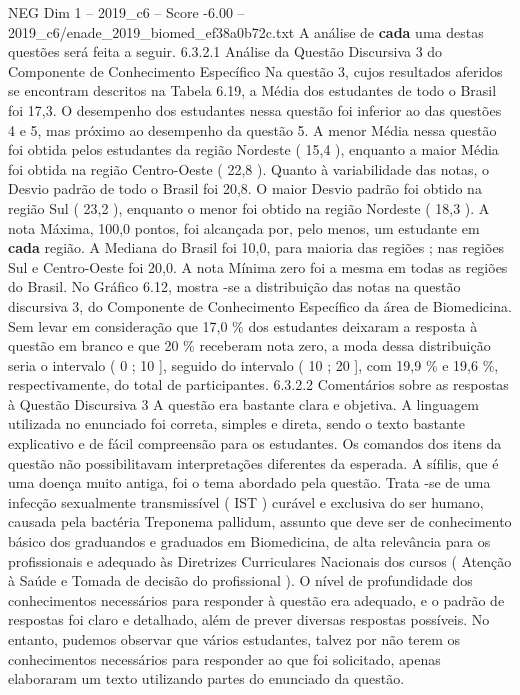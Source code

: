 \begin{textsample}{NEG Dim 1 – 2019\_c6 – Score -6.00 – 2019\_c6/enade\_2019\_biomed\_ef38a0b72c.txt}
A análise de \textbf{cada} uma destas questões será feita a seguir. 6.3.2.1 Análise da Questão Discursiva 3 do Componente de Conhecimento Específico Na questão 3, cujos resultados aferidos se encontram descritos na Tabela 6.19, a Média dos estudantes de todo o Brasil foi 17,3.
O desempenho dos estudantes nessa questão foi inferior ao das questões 4 e 5, mas próximo ao desempenho da questão 5.
A menor Média nessa questão foi obtida pelos estudantes da região Nordeste ( 15,4 ), enquanto a maior Média foi obtida na região Centro-Oeste ( 22,8 ).
Quanto à variabilidade das notas, o Desvio padrão de todo o Brasil foi 20,8.
O maior Desvio padrão foi obtido na região Sul ( 23,2 ), enquanto o menor foi obtido na região Nordeste ( 18,3 ).
A nota Máxima, 100,0 pontos, foi alcançada por, pelo menos, um estudante em \textbf{cada} região.
A Mediana do Brasil foi 10,0, para maioria das regiões ; nas regiões Sul e Centro-Oeste foi 20,0.
A nota Mínima zero foi a mesma em todas as regiões do Brasil.
No Gráfico 6.12, mostra -se a distribuição das notas na questão discursiva 3, do Componente de Conhecimento Específico da área de Biomedicina.
Sem levar em consideração que 17,0 \% dos estudantes deixaram a resposta à questão em branco e que 20 \% receberam nota zero, a moda dessa distribuição seria o intervalo ( 0 ; 10 ], seguido do intervalo ( 10 ; 20 ], com 19,9 \% e 19,6 \%, respectivamente, do total de participantes. 6.3.2.2 Comentários sobre as respostas à Questão Discursiva 3 A questão era bastante clara e objetiva.
A linguagem utilizada no enunciado foi correta, simples e direta, sendo o texto bastante explicativo e de fácil compreensão para os estudantes.
Os comandos dos itens da questão não possibilitavam interpretações diferentes da esperada.
A sífilis, que é uma doença muito antiga, foi o tema abordado pela questão.
Trata -se de uma infecção sexualmente transmissível ( IST ) curável e exclusiva do ser humano, causada pela bactéria Treponema pallidum, assunto que deve ser de conhecimento básico dos graduandos e graduados em Biomedicina, de alta relevância para os profissionais e adequado às Diretrizes Curriculares Nacionais dos cursos ( Atenção à Saúde e Tomada de decisão do profissional ).
O nível de profundidade dos conhecimentos necessários para responder à questão era adequado, e o padrão de respostas foi claro e detalhado, além de prever diversas respostas possíveis.
No entanto, pudemos observar que vários estudantes, talvez por não terem os conhecimentos necessários para responder ao que foi solicitado, apenas elaboraram um texto utilizando partes do enunciado da questão.

\end{textsample}
